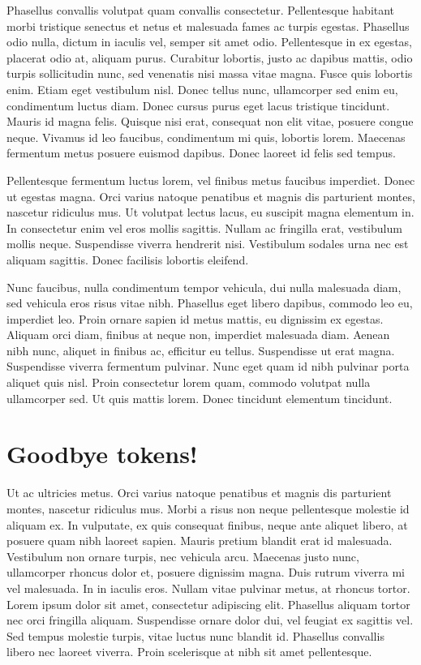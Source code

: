 \documentclass{article}
\begin{document}
Phasellus convallis volutpat quam convallis consectetur. Pellentesque habitant morbi tristique senectus et netus et malesuada fames ac turpis egestas. Phasellus odio nulla, dictum in iaculis vel, semper sit amet odio. Pellentesque in ex egestas, placerat odio at, aliquam purus. Curabitur lobortis, justo ac dapibus mattis, odio turpis sollicitudin nunc, sed venenatis nisi massa vitae magna. Fusce quis lobortis enim. Etiam eget vestibulum nisl. Donec tellus nunc, ullamcorper sed enim eu, condimentum luctus diam. Donec cursus purus eget lacus tristique tincidunt. Mauris id magna felis. Quisque nisi erat, consequat non elit vitae, posuere congue neque. Vivamus id leo faucibus, condimentum mi quis, lobortis lorem. Maecenas fermentum metus posuere euismod dapibus. Donec laoreet id felis sed tempus.

Pellentesque fermentum luctus lorem, vel finibus metus faucibus imperdiet. Donec ut egestas magna. Orci varius natoque penatibus et magnis dis parturient montes, nascetur ridiculus mus. Ut volutpat lectus lacus, eu suscipit magna elementum in. In consectetur enim vel eros mollis sagittis. Nullam ac fringilla erat, vestibulum mollis neque. Suspendisse viverra hendrerit nisi. Vestibulum sodales urna nec est aliquam sagittis. Donec facilisis lobortis eleifend.

Nunc faucibus, nulla condimentum tempor vehicula, dui nulla malesuada diam, sed vehicula eros risus vitae nibh. Phasellus eget libero dapibus, commodo leo eu, imperdiet leo. Proin ornare sapien id metus mattis, eu dignissim ex egestas. Aliquam orci diam, finibus at neque non, imperdiet malesuada diam. Aenean nibh nunc, aliquet in finibus ac, efficitur eu tellus. Suspendisse ut erat magna. Suspendisse viverra fermentum pulvinar. Nunc eget quam id nibh pulvinar porta aliquet quis nisl. Proin consectetur lorem quam, commodo volutpat nulla ullamcorper sed. Ut quis mattis lorem. Donec tincidunt elementum tincidunt.

\section{Goodbye tokens!}

Ut ac ultricies metus. Orci varius natoque penatibus et magnis dis parturient montes, nascetur ridiculus mus. Morbi a risus non neque pellentesque molestie id aliquam ex. In vulputate, ex quis consequat finibus, neque ante aliquet libero, at posuere quam nibh laoreet sapien. Mauris pretium blandit erat id malesuada. Vestibulum non ornare turpis, nec vehicula arcu. Maecenas justo nunc, ullamcorper rhoncus dolor et, posuere dignissim magna. Duis rutrum viverra mi vel malesuada. In in iaculis eros. Nullam vitae pulvinar metus, at rhoncus tortor. Lorem ipsum dolor sit amet, consectetur adipiscing elit. Phasellus aliquam tortor nec orci fringilla aliquam. Suspendisse ornare dolor dui, vel feugiat ex sagittis vel. Sed tempus molestie turpis, vitae luctus nunc blandit id. Phasellus convallis libero nec laoreet viverra. Proin scelerisque at nibh sit amet pellentesque. 
\end{document}
